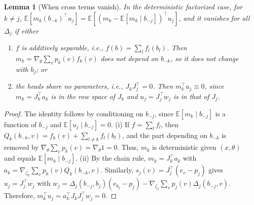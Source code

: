 \documentclass[10pt]{article}
\providecommand{\E}{\mathbb{E}}
\theoremstyle{plain}
\newtheorem{lemma}[theorem]{Lemma}
\theoremstyle{definition}
\theoremstyle{remark}
\theoremstyle{definition}
\newcommand{\score}[1]{s_{#1}}               %
\newcommand{\pj}[1]{p_{#1}}                  %
\begin{document}
\begin{lemma}[When cross terms vanish]\label{lem:cross}
    In the deterministic factorized case, for $k\neq j$, $\E[m_k(b_{-k})^{\top}u_j]=\E[(m_k-\E[m_k\mid b_{-j}])^{\top}u_j]$, and it vanishes for all $\Delta_j$ if either
    \begin{enumerate}[label=(\roman*)]
        \item $f$ is additively separable, i.e., $f(b)=\sum_l f_l(b_l)$. Then $m_k=\nabla_\theta\sum_v\pj{k}(v)f_k(v)$ does not depend on $b_{-k}$, so it does not change with $b_j$; or
        \item the heads share no parameters, i.e., $J_kJ_j^{\top}=0$. Then $m_k^{\top}u_j\equiv0$, since $m_k=J_k^{\top}a_k$ is in the row space of $J_k$ and $u_j=J_j^{\top}w_j$ is in that of $J_j$.
    \end{enumerate}
\end{lemma}
\begin{proof}
    The identity follows by conditioning on $b_{-j}$, since $\E[m_k\mid b_{-j}]$ is a function of $b_{-j}$ and $\E[u_j\mid b_{-j}]=0$. (i) If $f=\sum_l f_l$, then $Q_k(b_{-k},v)=f_k(v)+\sum_{l\neq k}f_l(b_l)$, and the part depending on $b_{-k}$ is removed by $\nabla_\theta\sum_v\pj{k}(v)=\nabla_\theta1=0$. Thus, $m_k$ is deterministic given $(x,\theta)$ and equals $\E[m_k\mid b_{-j}]$. (ii) By the chain rule, $m_k=J_k^{\top}a_k$ with $a_k=\nabla_{\zeta_k}\sum_v\pj{k}(v)Q_k(b_{-k},v)$. Similarly, $\score{j}(v)=J_j^{\top}(e_v-\pj{j})$ gives $u_j=J_j^{\top}w_j$ with $w_j=\Delta_j(b_{-j},b_j)(e_{b_j}-\pj{j})-\nabla_{\zeta_j}\sum_v\pj{j}(v)\Delta_j(b_{-j},v)$. Therefore, $m_k^{\top}u_j=a_k^{\top}J_kJ_j^{\top}w_j=0$.
\end{proof}
\end{document}
